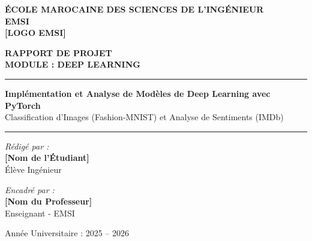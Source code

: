 \documentclass[12pt,a4paper,oneside]{report}
\begin{document}
\begin{titlepage}
    \begin{center}
        \large\textbf{ÉCOLE MAROCAINE DES SCIENCES DE L'INGÉNIEUR} \\
        \large\textbf{EMSI} \\
        \vspace{1cm}
        \textbf{[LOGO EMSI]} \\ %
        \hfill
        \vspace{1cm}
        
        \large\textbf{RAPPORT DE PROJET} \\
        \large\textbf{MODULE : DEEP LEARNING} \\
        \vspace{1.5cm}
        
        \hrule
        \vspace{0.4cm}
        {\huge \bfseries Implémentation et Analyse de Modèles de Deep Learning avec PyTorch} \\
        \vspace{0.2cm}
        {\large Classification d'Images (Fashion-MNIST) et Analyse de Sentiments (IMDb)}
        \vspace{0.4cm}
        \hrule
        
        \vspace{2.5cm}
        
        \begin{minipage}{0.45\textwidth}
            \begin{flushleft} \large
                \emph{Rédigé par :}\\
                \textbf{[Nom de l'Étudiant]} \\
                Élève Ingénieur
            \end{flushleft}
        \end{minipage}
        \hfill
        \begin{minipage}{0.45\textwidth}
            \begin{flushright} \large
                \emph{Encadré par :}\\
                \textbf{[Nom du Professeur]} \\
                Enseignant - EMSI
            \end{flushright}
        \end{minipage}
        
        \vfill
        \large Année Universitaire : 2025 -- 2026
    \end{center}
\end{titlepage}
\end{document}
